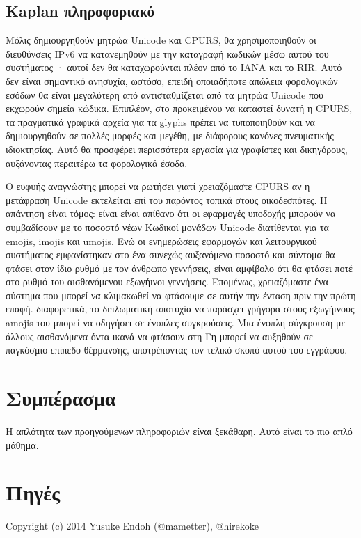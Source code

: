 \documentclass[11pt,a4paper,notitlepage,fleqn]{article}
\begin{document}
\subsection{Kaplan πληροφοριακό}


Μόλις δημιουργηθούν μητρώα Unicode και CPURS, θα χρησιμοποιηθούν οι διευθύνσεις IPv6
να κατανεμηθούν με την καταγραφή κωδικών μέσω αυτού του συστήματος · αυτοί
δεν θα καταχωρούνται πλέον από το IANA και το RIR. Αυτό δεν είναι σημαντικό
ανησυχία, ωστόσο, επειδή οποιαδήποτε απώλεια φορολογικών εσόδων θα είναι μεγαλύτερη από
αντισταθμίζεται από τα μητρώα Unicode που εκχωρούν σημεία κώδικα. Επιπλέον, στο
προκειμένου να καταστεί δυνατή η CPURS, τα πραγματικά γραφικά αρχεία για τα glyphs
πρέπει να τυποποιηθούν και να δημιουργηθούν σε πολλές μορφές και μεγέθη,
με διάφορους κανόνες πνευματικής ιδιοκτησίας. Αυτό θα προσφέρει περισσότερα
εργασία για γραφίστες και δικηγόρους, αυξάνοντας περαιτέρω τα φορολογικά έσοδα.

Ο ευφυής αναγνώστης μπορεί να ρωτήσει γιατί χρειαζόμαστε CPURS αν η μετάφραση Unicode
εκτελείται επί του παρόντος τοπικά στους οικοδεσπότες. Η απάντηση είναι τόμος: είναι
είναι απίθανο ότι οι εφαρμογές υποδοχής μπορούν να συμβαδίσουν με το ποσοστό νέων
Κωδικοί μονάδων Unicode διατίθενται για τα emojis, imojis και umojis.
Ενώ οι ενημερώσεις εφαρμογών και λειτουργικού συστήματος εμφανίστηκαν στο
ένα συνεχώς αυξανόμενο ποσοστό και σύντομα θα φτάσει στον ίδιο ρυθμό με τον άνθρωπο
γεννήσεις, είναι αμφίβολο ότι θα φτάσει ποτέ στο ρυθμό του αισθανόμενου
εξωγήινοι γεννήσεις. Επομένως, χρειαζόμαστε ένα σύστημα που μπορεί να κλιμακωθεί
να φτάσουμε σε αυτήν την ένταση πριν την πρώτη επαφή. διαφορετικά, το
διπλωματική αποτυχία να παράσχει γρήγορα στους εξωγήινους amojis του
μπορεί να οδηγήσει σε ένοπλες συγκρούσεις. Μια ένοπλη σύγκρουση με άλλους
αισθανόμενα όντα ικανά να φτάσουν στη Γη μπορεί να αυξηθούν σε παγκόσμιο επίπεδο
θέρμανσης, αποτρέποντας τον τελικό σκοπό αυτού του εγγράφου.

\section{Συμπέρασμα}
Η απλότητα των προηγούμενων πληροφοριών είναι ξεκάθαρη. Αυτό είναι το πιο απλό μάθημα.

\newpage
\section*{Πηγές}

	Copyright (c) 2014 Yusuke Endoh (@mametter), @hirekoke
	
\end{document}
